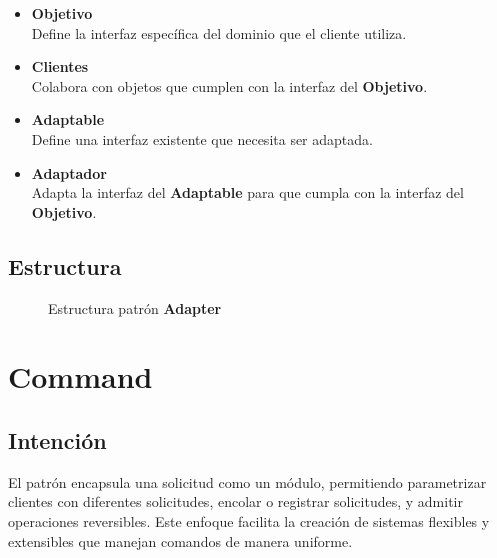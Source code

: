 \begin{itemize}
\item \textbf{Objetivo}\\
Define la interfaz específica del dominio que el cliente utiliza.
\item \textbf{Clientes}\\
Colabora con objetos que cumplen con la interfaz del \textbf{Objetivo}.
\item \textbf{Adaptable}\\
Define una interfaz existente que necesita ser adaptada.
\item \textbf{Adaptador}\\
Adapta la interfaz del \textbf{Adaptable} para que cumpla con la interfaz del \textbf{Objetivo}.
\end{itemize}

\subsection*{Estructura}

\begin{figure}[h]
\caption{Estructura patrón \textbf{Adapter}}
\begin{center}
\end{center}
\end{figure}


\section{Command}


\subsection*{Intención}

El patrón encapsula una solicitud como un módulo, permitiendo parametrizar clientes con diferentes solicitudes, encolar o registrar solicitudes, y admitir operaciones reversibles. Este enfoque facilita la creación de sistemas flexibles y extensibles que manejan comandos de manera uniforme.

